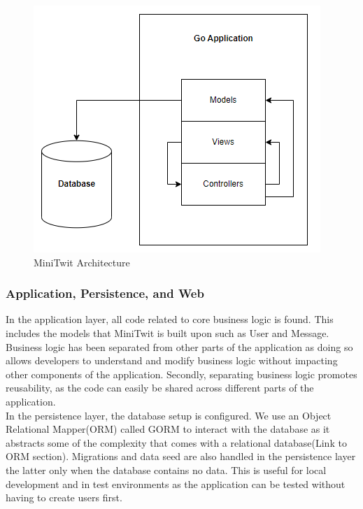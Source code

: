 \begin{figure}[H]
    \centering
    \captionsetup{justification=centering,margin=1cm}
    \includegraphics[width=0.8\linewidth]{report/images/system_architecture.png}
    \caption{MiniTwit Architecture}
    \label{fig:minitwit}
\end{figure}



\subsubsection{Application, Persistence, and Web}
In the application layer, all code related to core business logic is found. This includes the models that MiniTwit is built upon such as User and Message. 
Business logic has been separated from other parts of the application as doing so allows developers to understand and 
modify business logic without impacting other components of the application. Secondly, separating business logic promotes reusability, 
as the code can easily be shared across different parts of the application.     \\

In the persistence layer, the database setup is configured. We use an Object Relational Mapper(ORM) called GORM to interact 
with the database as it abstracts some of the complexity that comes with a relational database(Link to ORM section). 
Migrations and data seed are also handled in the persistence layer the latter only when the database contains no data. 
This is useful for local development and in test environments as the application can be tested without having to create users first. \\

